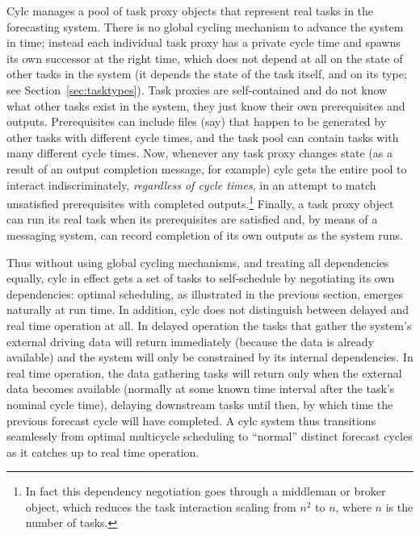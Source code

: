 \documentclass[11pt,a4paper]{article}
\begin{document}
Cylc manages a pool of task proxy objects that represent real tasks in
the forecasting system. There is no global cycling mechanism to advance
the system in time; instead each individual task proxy has a private
cycle time and spawns its own successor at the right time, which does
not depend at all on the state of other tasks in the system (it depends
the state of the task itself, and on its type; see
Section~\ref{sec:tasktypes}). Task proxies are self-contained and do not
know what other tasks exist in the system, they just know their own
prerequisites and outputs. Prerequisites can include files (say) that
happen to be generated by other tasks with different cycle times, and
the task pool can contain tasks with many different cycle times.  Now,
whenever any task proxy changes state (as a result of an output
completion message, for example) cylc gets the entire pool to interact
indiscriminately, {\em regardless of cycle times}, in an attempt to
match unsatisfied prerequisites with completed outputs.\footnote{In fact
this dependency negotiation goes through a middleman or broker object,
which reduces the task interaction scaling from $n^2$ to $n$, where $n$
is the number of tasks.} Finally, a task proxy object can run its real
task when its prerequisites are satisfied and, by means of a messaging
system, can record completion of its own outputs as the system runs. 

Thus without using global cycling mechanisms, and treating all
dependencies equally, cylc in effect gets a set of tasks to
self-schedule by negotiating its own dependencies: optimal scheduling,
as illustrated in the previous section, emerges naturally at run time.
In addition, cylc does not distinguish between delayed and real time
operation at all. In delayed operation the tasks that gather the
system's external driving data will return immediately (because the data
is already available) and the system will only be constrained by its
internal dependencies. In real time operation, the data gathering tasks
will return only when the external data becomes available (normally at
some known time interval after the task's nominal cycle time), delaying
downstream tasks until then, by which time the previous forecast cycle
will have completed. A cylc system thus transitions seamlessly from
optimal multicycle scheduling to ``normal'' distinct forecast cycles as
it catches up to real time operation.
\end{document}
